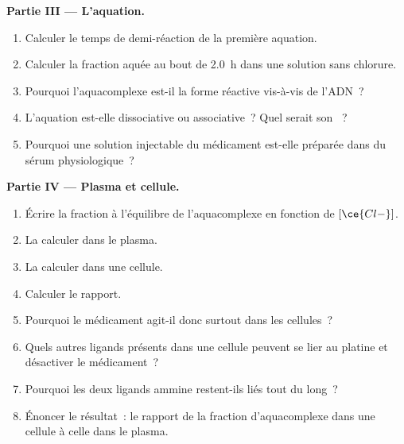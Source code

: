 \begin{problem}
\medskip\noindent\textbf{Partie III --- L'aquation.}
\begin{enumerate}[resume]
  \item Calculer le temps de demi-réaction de la première aquation.
  \item Calculer la fraction aquée au bout de \qty{2.0}{h} dans une solution
        sans chlorure.
  \item Pourquoi l'aquacomplexe est-il la forme réactive vis-à-vis de
        l'ADN~?
  \item L'aquation est-elle dissociative ou associative~? Quel serait son
        ~?
  \item Pourquoi une solution injectable du médicament est-elle préparée
        dans du sérum physiologique~?
\end{enumerate}

\medskip\noindent\textbf{Partie IV --- Plasma et cellule.}
\begin{enumerate}[resume]
  \item Écrire la fraction à l'équilibre de l'aquacomplexe en fonction de
        $[\ce{Cl-}]$.
  \item La calculer dans le plasma.
  \item La calculer dans une cellule.
  \item Calculer le rapport.
  \item Pourquoi le médicament agit-il donc surtout dans les cellules~?
  \item Quels autres ligands présents dans une cellule peuvent se lier au
        platine et désactiver le médicament~?
  \item Pourquoi les deux ligands ammine restent-ils liés tout du long~?
  \item Énoncer le résultat~: le rapport de la fraction d'aquacomplexe dans
        une cellule à celle dans le plasma.
\end{enumerate}
\end{problem}
